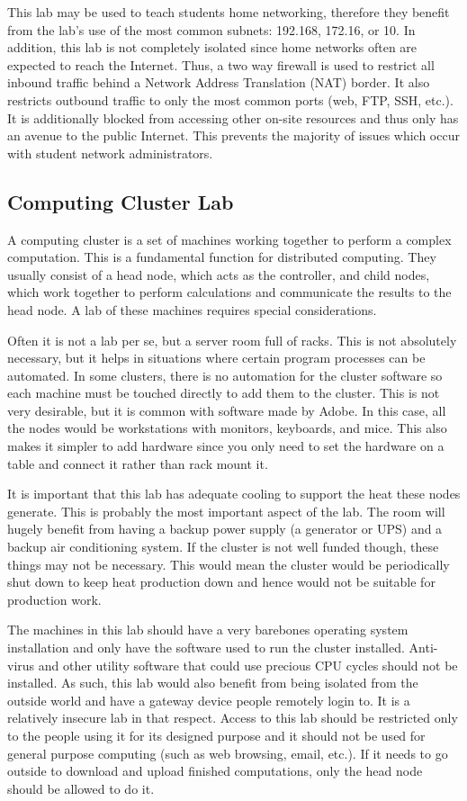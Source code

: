 This lab may be used to teach students home networking, therefore they benefit from the lab's use of the most common subnets:  192.168, 172.16, or 10.  In addition, this lab is not completely isolated since home networks often are expected to reach the Internet.  Thus, a two way firewall is used to restrict all inbound traffic behind a Network Address Translation (NAT) border.  It also restricts outbound traffic to only the most common ports (web, FTP, SSH, etc.).  It is additionally blocked from accessing other on-site resources and thus only has an avenue to the public Internet.  This prevents the majority of issues which occur with student network administrators.   

\subsection{Computing Cluster Lab}
A computing cluster is a set of machines working together to perform a complex computation.  This is a fundamental function for distributed computing.  They usually consist of a head node, which acts as the controller, and child nodes, which work together to perform calculations and communicate the results to the head node.  A lab of these machines requires special considerations.  

Often it is not a lab per se, but a server room full of racks.  This is not absolutely necessary, but it helps in situations where certain program processes can be automated.  In some clusters, there is no automation for the cluster software so each machine must be touched directly to add them to the cluster.  This is not very desirable, but it is common with software made by Adobe.  In this case, all the nodes would be workstations with monitors, keyboards, and mice.  This also makes it simpler to add hardware since you only need to set the hardware on a table and connect it rather than rack mount it.  

It is important that this lab has adequate cooling to support the heat these nodes generate.  This is probably the most important aspect of the lab.  The room will hugely benefit from having a backup power supply (a generator or UPS) and a backup air conditioning system.  If the cluster is not well funded though, these things may not be necessary.  This would mean the cluster would be periodically shut down to keep heat production down and hence would not be suitable for production work.  

The machines in this lab should have a very barebones operating system installation and only have the software used to run the cluster installed.  Anti-virus and other utility software that could use precious CPU cycles should not be installed.  As such, this lab would also benefit from being isolated from the outside world and have a gateway device people remotely login to.  It is a relatively insecure lab in that respect.  Access to this lab should be restricted only to the people using it for its designed purpose and it should not be used for general purpose computing (such as web browsing, email, etc.).  If it needs to go outside to download and upload finished computations, only the head node should be allowed to do it.  

